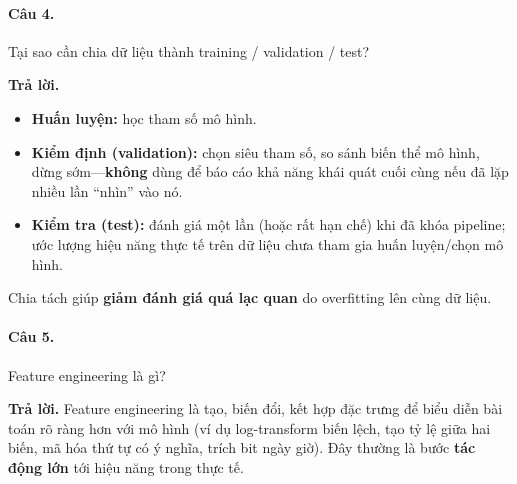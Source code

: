 \paragraph{Câu 4.} Tại sao cần chia dữ liệu thành training / validation / test?

\medskip\noindent\textbf{Trả lời.}
\begin{itemize}[nosep]
\item \textbf{Huấn luyện:} học tham số mô hình.
\item \textbf{Kiểm định (validation):} chọn siêu tham số, so sánh biến thể mô hình, dừng sớm---\textbf{không} dùng để báo cáo khả năng khái quát cuối cùng nếu đã lặp nhiều lần ``nhìn'' vào nó.
\item \textbf{Kiểm tra (test):} đánh giá một lần (hoặc rất hạn chế) khi đã khóa pipeline; ước lượng hiệu năng thực tế trên dữ liệu chưa tham gia huấn luyện/chọn mô hình.
\end{itemize}
Chia tách giúp \textbf{giảm đánh giá quá lạc quan} do overfitting lên cùng dữ liệu.

\paragraph{Câu 5.} Feature engineering là gì?

\medskip\noindent\textbf{Trả lời.} Feature engineering là tạo, biến đổi, kết hợp đặc trưng để biểu diễn bài toán rõ ràng hơn với mô hình (ví dụ log-transform biến lệch, tạo tỷ lệ giữa hai biến, mã hóa thứ tự có ý nghĩa, trích bit ngày giờ). Đây thường là bước \textbf{tác động lớn} tới hiệu năng trong thực tế.

